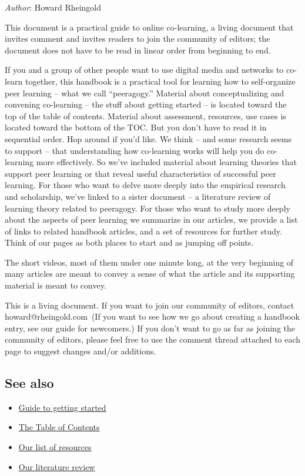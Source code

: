 \emph{Author}: Howard Rheingold

This document is a practical guide to online co-learning, a living
document that invites comment and invites readers to join the community
of editors; the document does not have to be read in linear order from
beginning to end.

If you and a group of other people want to use digital media and
networks to co-learn together, this handbook is a practical tool for
learning how to self-organize peer learning -- what we call
``peeragogy.'' Material about conceptualizing and convening co-learning
-- the stuff about getting started -- is located toward the top of the
table of contents. Material about assessment, resources, use cases is
located toward the bottom of the TOC. But you don't have to read it in
sequential order. Hop around if you'd like. We think -- and some
research seems to support -- that understanding how co-learning works
will help you do co-learning more effectively. So we've included
material about learning theories that support peer learning or that
reveal useful characteristics of successful peer learning. For those who
want to delve more deeply into the empirical research and scholarship,
we've linked to a sister document -- a literature review of learning
theory related to peeragogy. For those who want to study more deeply
about the aspects of peer learning we summarize in our articles, we
provide a list of links to related handbook articles, and a set of
resources for further study. Think of our pages as both places to start
and as jumping off points.

The short videos, most of them under one minute long, at the very
beginning of many articles are meant to convey a sense of what the
article and its supporting material is meant to convey.

This is a living document. If you want to join our community of editors,
contact howard@rheingold.com~(If you want to see how we go about
creating a handbook entry, see our guide for newcomers.) If you don't
want to go as far as joining the community of editors, please feel free
to use the comment thread attached to each page to suggest changes
and/or additions.

\subsection{See also}

\begin{itemize}
\item
  \href{http://peeragogy.org/how-to-get-involved/}{Guide to getting
  started}
\item
  \href{http://peeragogy.org/table-of-contents/}{The Table of Contents}
\item
  \href{http://peeragogy.org/resources/}{Our list of resources}
\item
  \href{http://peeragogy.org/resources/literature-review-peeragogy/}{Our
  literature review}
\end{itemize}

~
